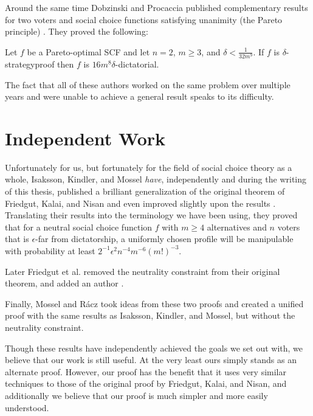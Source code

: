 	Around the same time Dobzinski and Procaccia published complementary results for two voters and social choice functions satisfying unanimity (the Pareto principle) \cite{dobzinski2008frequent}. They proved the following:

	\begin{theorem}
		Let $f$ be a Pareto-optimal SCF and let $n = 2$, $m \ge 3$, and $\delta < \frac{1}{32m^9}$. If $f$ is $\delta$-strategyproof then $f$ is $16m^8 \delta$-dictatorial.
	\end{theorem}

	The fact that all of these authors worked on the same problem over multiple years and were unable to achieve a general result speaks to its difficulty.


\section{Independent Work}

	Unfortunately for us, but fortunately for the field of social choice theory as a whole, Isaksson, Kindler, and Mossel \emph{have}, independently and during the writing of this thesis, published a brilliant generalization of the original theorem of Friedgut, Kalai, and Nisan and even improved slightly upon the results \cite{isaksson2010geometry}. Translating their results into the terminology we have been using, they proved that for a neutral social choice function $f$ with $m \ge 4$ alternatives and $n$ voters that is $\epsilon$-far from dictatorship, a uniformly chosen profile will be manipulable with probability at least $2^{-1} \epsilon^2 n^{-4} m^{-6} (m!)^{-3}$.

	Later Friedgut et al. removed the neutrality constraint from their original theorem, and added an author \cite{friedgut2011quantitative}.

	Finally, Mossel and R\'{a}cz \cite{mossel2011quantitative} took ideas from these two proofs and created a unified proof with the same results as Isaksson, Kindler, and Mossel, but without the neutrality constraint.

	Though these results have independently achieved the goals we set out with, we believe that our work is still useful. At the very least ours simply stands as an alternate proof. However, our proof has the benefit that it uses very similar techniques to those of the original proof by Friedgut, Kalai, and Nisan, and additionally we believe that our proof is much simpler and more easily understood.


